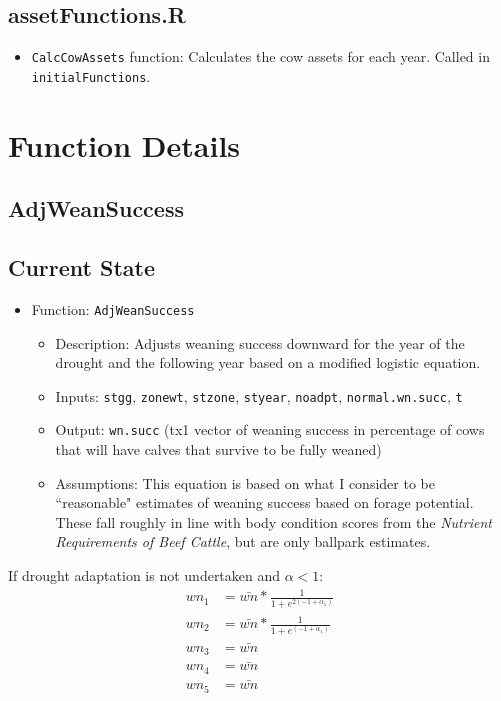 \documentclass[11pt]{article}
\begin{document}
\subsection{assetFunctions.R}
\begin{itemize}
	\item \verb!CalcCowAssets! function: Calculates the cow assets for each year. Called in \verb!initialFunctions!.
\end{itemize}


\section{Function Details}

\subsection{AdjWeanSuccess}

\subsection{Current State}
\begin{itemize}
\item Function: \verb!AdjWeanSuccess!
	\begin{itemize}
	\item Description: Adjusts weaning success downward for the year of the drought and the following year based on a modified logistic equation. 
	\item Inputs: \verb!stgg!, \verb!zonewt!, \verb!stzone!, \verb!styear!, \verb!noadpt!, \verb!normal.wn.succ!, \verb!t!
	\item Output: \verb!wn.succ! (tx1 vector of weaning success in percentage of cows that will have calves that survive to be fully weaned)
	\item Assumptions: This equation is based on what I consider to be ``reasonable" estimates of weaning success based on forage potential. These fall roughly in line with body condition scores from the \textit{Nutrient Requirements of Beef Cattle}, but are only ballpark estimates.
	\end{itemize}
\end{itemize}

If drought adaptation is not undertaken and $\alpha < 1$:
\begin{align}
wn_1 &= \bar{wn} * \frac{1}{1 + e^{2(-1 + \alpha_1)}} \\
wn_2 &= \bar{wn} * \frac{1}{1 + e^{(-1 + \alpha_1)}} \\
wn_3 &= \bar{wn} \\
wn_4 &= \bar{wn} \\
wn_5 &= \bar{wn} \\
\end{align}
\end{document}
